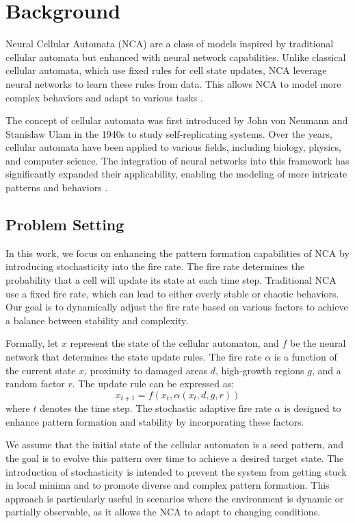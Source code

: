 \documentclass{article} %
\begin{document}
\section{Background}
\label{sec:background}

Neural Cellular Automata (NCA) are a class of models inspired by traditional cellular automata but enhanced with neural network capabilities. Unlike classical cellular automata, which use fixed rules for cell state updates, NCA leverage neural networks to learn these rules from data. This allows NCA to model more complex behaviors and adapt to various tasks \citep{lu2024aiscientist}.

The concept of cellular automata was first introduced by John von Neumann and Stanislaw Ulam in the 1940s to study self-replicating systems. Over the years, cellular automata have been applied to various fields, including biology, physics, and computer science. The integration of neural networks into this framework has significantly expanded their applicability, enabling the modeling of more intricate patterns and behaviors \citep{goodfellow2016deep}.

\subsection{Problem Setting}
In this work, we focus on enhancing the pattern formation capabilities of NCA by introducing stochasticity into the fire rate. The fire rate determines the probability that a cell will update its state at each time step. Traditional NCA use a fixed fire rate, which can lead to either overly stable or chaotic behaviors. Our goal is to dynamically adjust the fire rate based on various factors to achieve a balance between stability and complexity.

Formally, let \( x \) represent the state of the cellular automaton, and \( f \) be the neural network that determines the state update rules. The fire rate \( \alpha \) is a function of the current state \( x \), proximity to damaged areas \( d \), high-growth regions \( g \), and a random factor \( r \). The update rule can be expressed as:
\[
x_{t+1} = f(x_t, \alpha(x_t, d, g, r))
\]
where \( t \) denotes the time step. The stochastic adaptive fire rate \( \alpha \) is designed to enhance pattern formation and stability by incorporating these factors.

We assume that the initial state of the cellular automaton is a seed pattern, and the goal is to evolve this pattern over time to achieve a desired target state. The introduction of stochasticity is intended to prevent the system from getting stuck in local minima and to promote diverse and complex pattern formation. This approach is particularly useful in scenarios where the environment is dynamic or partially observable, as it allows the NCA to adapt to changing conditions.
\end{document}

